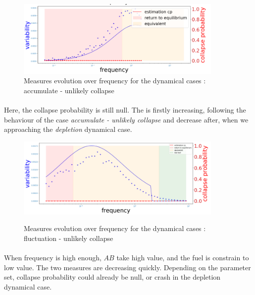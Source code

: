\documentclass{article}
\begin{document}
\begin{figure}[h!]
\begin{center}
\includegraphics[width=10cm]{results/return_never_2.png}
\end{center}
\caption{\label{fig:temp}Measures evolution over frequency for the dynamical cases : accumulate - unlikely collapse}
\end{figure}


\paragraph{}
Here, the collapse probability is still null. The is firstly increasing, following the behaviour of the case \textit{accumulate - unlikely collapse} and decrease after, when we approaching the \textit{depletion} dynamical case.


\begin{figure}[h!]
\begin{center}
\includegraphics[width=10cm]{results/equivalent_never.png} \\
\end{center}
\caption{\label{fig:temp}Measures evolution over frequency for the dynamical cases : fluctuation - unlikely collapse}
\end{figure}


\paragraph{}
When frequency is high enough, $AB$ take high value, and the fuel is constrain to low value. The two measures are decreasing quickly. Depending on the parameter set, collapse probability could already be null, or crash in the depletion dynamical case.
\end{document}
